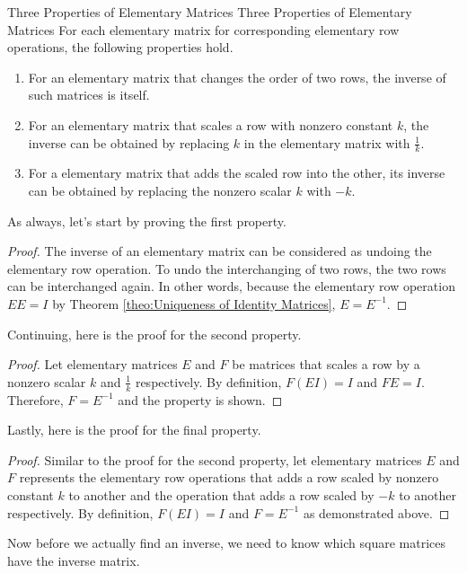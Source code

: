 \documentclass[../main.tex]{subfiles}
\begin{document}
\begin{theorem}{Three Properties of Elementary Matrices}
{Three Properties of Elementary Matrices}
For each elementary matrix for corresponding elementary row
operations, the following properties hold.
\begin{enumerate}[noitemsep]
\item
For an elementary matrix that changes the order of two rows,
the inverse of such matrices is itself.
\item
For an elementary matrix that scales a row with nonzero constant
$k$, the inverse can be obtained by replacing $k$ in the elementary
matrix with $\frac{1}{k}$.
\item
For a elementary matrix that adds the scaled row into the other,
its inverse can be obtained by replacing the nonzero scalar $k$
with $-k$.
\end{enumerate}
\end{theorem}

As always, let's start by proving the first property.

\begin{proof}
The inverse of an elementary matrix can be considered as undoing
the elementary row operation. To undo the interchanging of two rows,
the two rows can be interchanged again. In other words, because
the elementary row operation $EE = I$ by Theorem \ref{theo:Uniqueness
of Identity Matrices}, $E = E^{-1}$.
\end{proof}

Continuing, here is the proof for the second property.

\begin{proof}
Let elementary matrices $E$ and $F$ be matrices that scales a
row by a nonzero scalar $k$ and $\frac{1}{k}$ respectively.
By definition, $F(EI) = I$ and $FE = I$. Therefore, $F = E^{-1}$
and the property is shown.
\end{proof}

Lastly, here is the proof for the final property.

\begin{proof}
Similar to the proof for the second property, let elementary matrices
$E$ and $F$ represents the elementary row operations that adds a
row scaled by nonzero constant $k$ to another and the operation
that adds a row scaled by $-k$ to another respectively. By definition,
$F(EI) = I$ and $F = E^{-1}$ as demonstrated above.
\end{proof}

Now before we actually find an inverse, we need to know which
square matrices have the inverse matrix.
\end{document}
